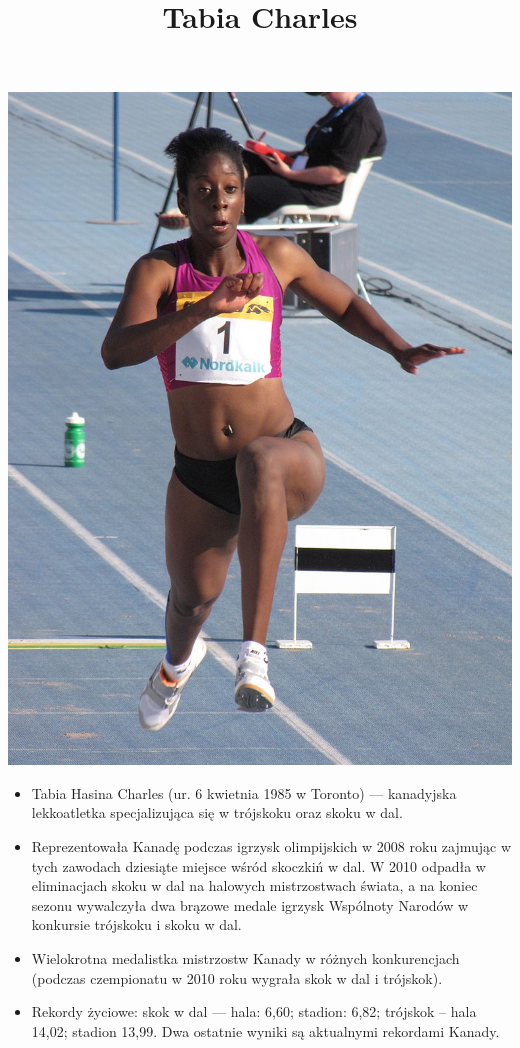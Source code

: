 \documentclass[a4paper,12pt]{article}
\title{Tabia Charles}
\author{}
\begin{document}
\maketitle
\centering
\includegraphics[scale=0.50]{Tabia-Charles.jpg}
\begin{itemize}
\item
Tabia Hasina Charles (ur. 6 kwietnia 1985 w Toronto) --- kanadyjska lekkoatletka specjalizująca się w trójskoku oraz skoku w dal.
\item Reprezentowała Kanadę podczas igrzysk olimpijskich w 2008 roku zajmując w tych zawodach dziesiąte miejsce wśród skoczkiń w dal. W 2010 odpadła w eliminacjach skoku w dal na halowych mistrzostwach świata, a na koniec sezonu wywalczyła dwa brązowe medale igrzysk Wspólnoty Narodów w konkursie trójskoku i skoku w dal.
\item Wielokrotna medalistka mistrzostw Kanady w różnych konkurencjach (podczas czempionatu w 2010 roku wygrała skok w dal i trójskok).

\item Rekordy życiowe: skok w dal --- hala: 6,60; stadion: 6,82; trójskok – hala 14,02; stadion 13,99. Dwa ostatnie wyniki są aktualnymi rekordami Kanady.

\end{itemize}
\end{document}
